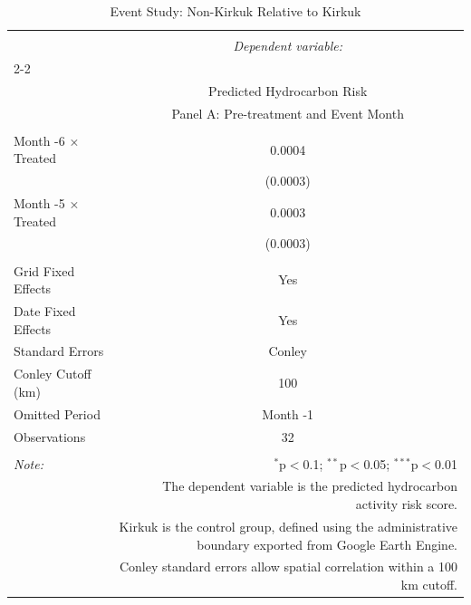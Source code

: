 
\begin{table}[!htbp] \centering 
  \caption{Event Study: Non-Kirkuk Relative to Kirkuk} 
  \label{tab:eventstudy_full_A} 
\scriptsize 
\begin{tabular}{@{\extracolsep{5pt}}lc} 
\\[-1.8ex]\hline 
\hline \\[-1.8ex] 
 & \multicolumn{1}{c}{\textit{Dependent variable:}} \\ 
\cline{2-2} 
\\[-1.8ex] & Predicted Hydrocarbon Risk \\ 
 & Panel A: Pre-treatment and Event Month \\ 
\hline \\[-1.8ex] 
 Month -6 × Treated & 0.0004 \\ 
  & (0.0003) \\ 
  Month -5 × Treated & 0.0003 \\ 
  & (0.0003) \\ 
 \hline \\[-1.8ex] 
Grid Fixed Effects & Yes \\ 
Date Fixed Effects & Yes \\ 
Standard Errors & Conley \\ 
Conley Cutoff (km) & 100 \\ 
Omitted Period & Month -1 \\ 
Observations & 32 \\ 
\hline 
\hline \\[-1.8ex] 
\textit{Note:}  & \multicolumn{1}{r}{$^{*}$p$<$0.1; $^{**}$p$<$0.05; $^{***}$p$<$0.01} \\ 
 & \multicolumn{1}{r}{The dependent variable is the predicted hydrocarbon activity risk score.} \\ 
 & \multicolumn{1}{r}{Kirkuk is the control group, defined using the administrative boundary exported from Google Earth Engine.} \\ 
 & \multicolumn{1}{r}{Conley standard errors allow spatial correlation within a 100 km cutoff.} \\ 
\end{tabular} 
\end{table} 
